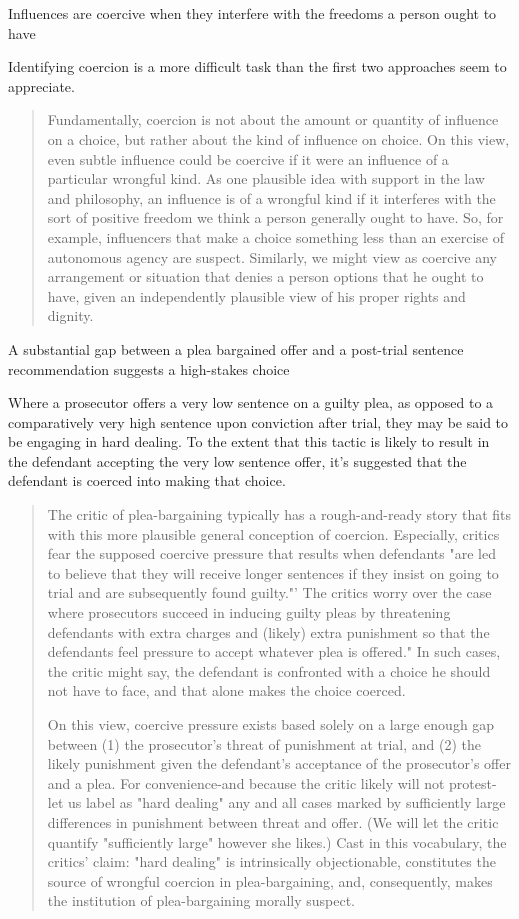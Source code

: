 Influences are coercive when they interfere with the freedoms a person ought to have

Identifying coercion is a more difficult task than the first two approaches seem to appreciate.
\begin{quote}
    Fundamentally, coercion is not about the amount or quantity of influence on a choice, but rather about the kind of influence on choice. On this view, even subtle influence could be coercive if it were an influence of a particular wrongful kind. As one plausible idea with support in the law and philosophy, an influence is of a wrongful kind if it interferes with the sort of positive freedom we think a person generally ought to have. So, for example, influencers that make a choice something less than an exercise of autonomous agency are suspect. Similarly, we might view as coercive any arrangement or situation that denies a person options that he ought to have, given an independently plausible view of his proper rights and dignity.
\end{quote}

A substantial gap between a plea bargained offer and a post-trial sentence recommendation suggests a high-stakes choice

Where a prosecutor offers a very low sentence on a guilty plea, as opposed to a comparatively very high sentence upon conviction after trial, they may be said to be engaging in hard dealing. To the extent that this tactic is likely to result in the defendant accepting the very low sentence offer, it's suggested that the defendant is coerced into making that choice.

\begin{quote}
    The critic of plea-bargaining typically has a rough-and-ready story that fits with this more plausible general conception of coercion. Especially, critics fear the supposed coercive pressure that results when defendants "are led to believe that they will receive longer sentences if they insist on going to trial and are subsequently found guilty."' The critics worry over the case where prosecutors succeed in inducing guilty pleas by threatening defendants with extra charges and (likely) extra punishment so that the defendants feel pressure to accept whatever plea is offered." In such cases, the critic might say, the defendant is confronted with a choice he should not have to face, and that alone makes the choice coerced.
    
    On this view, coercive pressure exists based solely on a large enough gap between (1) the prosecutor's threat of punishment at trial, and (2) the likely punishment given the defendant's acceptance of the prosecutor's offer and a plea. For convenience-and because the critic likely will not protest-let us label as "hard dealing" any and all cases marked by sufficiently large differences in punishment between threat and offer. (We will let the critic quantify "sufficiently large" however she likes.) Cast in this vocabulary, the critics' claim: "hard dealing" is intrinsically objectionable, constitutes the source of wrongful coercion in plea-bargaining, and, consequently, makes the institution of plea-bargaining morally suspect.
\end{quote}

